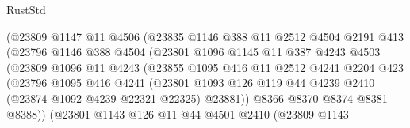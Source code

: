 \begin{lexlean}{RustStd}
\begin{coremodule}
                          (@23809
                            @1147
                            @11
                            @4506
                            (@23835
                              @1146
                              @388
                              @11
                              @2512
                              @4504
                              @2191
                              @413
                              (@23796
                                @1146
                                @388
                                @4504
                                (@23801
                                  @1096
                                  @1145
                                  @11
                                  @387
                                  @4243
                                  @4503
                                  (@23809
                                    @1096
                                    @11
                                    @4243
                                    (@23855
                                      @1095
                                      @416
                                      @11
                                      @2512
                                      @4241
                                      @2204
                                      @423
                                      (@23796
                                        @1095
                                        @416
                                        @4241
                                        (@23801
                                          @1093
                                          @126
                                          @119
                                          @44
                                          @4239
                                          @2410
                                          (@23874 @1092 @4239 @22321 @22325)
                                          @23881))
                                      @8366
                                      @8370
                                      @8374
                                      @8381
                                      @8388))
                                  (@23801
                                    @1143
                                    @126
                                    @11
                                    @44
                                    @4501
                                    @2410
                                    (@23809
                                      @1143

\end{coremodule}
\end{lexlean}
